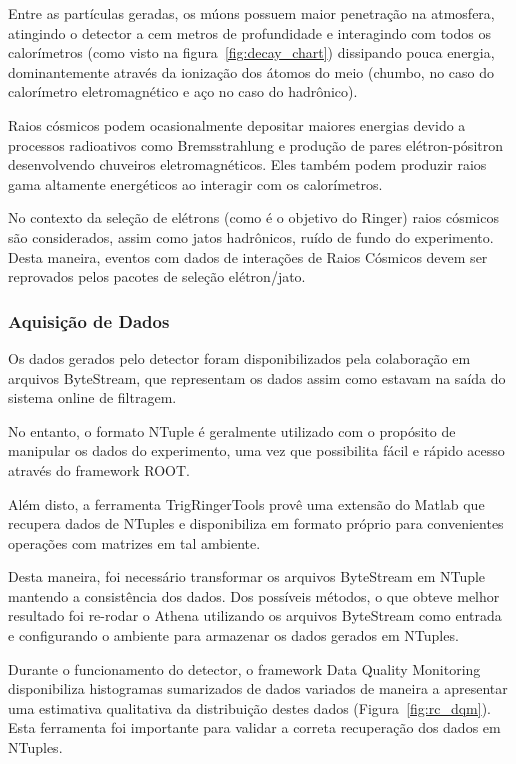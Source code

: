 \documentclass[a4paper,10pt,titlepage]{article}
\begin{document}
Entre as partículas geradas, os múons possuem maior penetração na atmosfera, atingindo o detector a cem metros de profundidade e interagindo com todos os calorímetros (como visto na figura~\ref{fig:decay_chart}) dissipando pouca energia, dominantemente através da ionização dos átomos do meio (chumbo, no caso do calorímetro eletromagnético e aço no caso do hadrônico).

Raios cósmicos podem ocasionalmente depositar maiores energias devido a processos radioativos como Bremsstrahlung e produção de pares elétron-pósitron desenvolvendo chuveiros eletromagnéticos.
Eles também podem produzir raios gama altamente energéticos ao interagir com os calorímetros.

No contexto da seleção de elétrons (como é o objetivo do Ringer) raios cósmicos são considerados, assim como jatos hadrônicos, ruído de fundo do experimento.
Desta maneira, eventos com dados de interações de Raios Cósmicos devem ser reprovados pelos pacotes de seleção elétron/jato.

\subsubsection{Aquisição de Dados}

Os dados gerados pelo detector foram disponibilizados pela colaboração em arquivos ByteStream, que representam os dados assim como estavam na saída do sistema online de filtragem.

No entanto, o formato NTuple é geralmente utilizado com o propósito de manipular os dados do experimento, uma vez que possibilita fácil e rápido acesso através do framework ROOT.

Além disto, a ferramenta TrigRingerTools provê uma extensão do Matlab que recupera dados de NTuples e disponibiliza em formato próprio para convenientes operações com matrizes em tal ambiente.

Desta maneira, foi necessário transformar os arquivos ByteStream em NTuple mantendo a consistência dos dados.
Dos possíveis métodos, o que obteve melhor resultado foi re-rodar o Athena utilizando os arquivos ByteStream como entrada e configurando o ambiente para armazenar os dados gerados em NTuples.

Durante o funcionamento do detector, o framework Data Quality Monitoring disponibiliza histogramas sumarizados de dados variados de maneira a apresentar uma estimativa qualitativa da distribuição destes dados (Figura~\ref{fig:rc_dqm}).
Esta ferramenta foi importante para validar a correta recuperação dos dados em NTuples.
\end{document}
